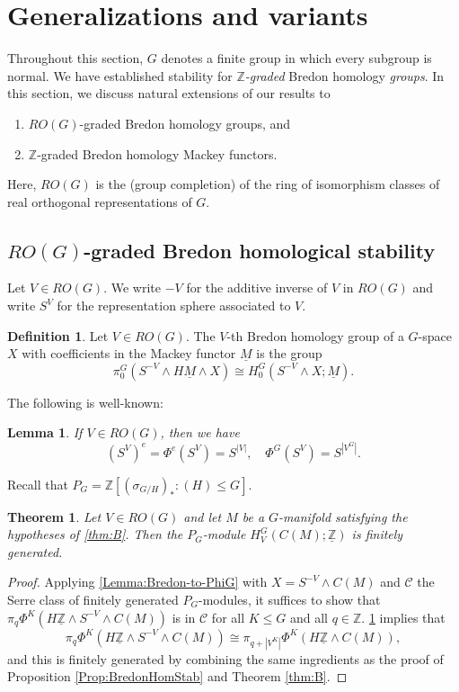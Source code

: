 \documentclass[11pt]{amsart}
\newtheorem{lemma}[equation]{Lemma}
\newtheorem{theorem}[equation]{Theorem}
\theoremstyle{definition}
\newtheorem{definition}[equation]{Definition}
\numberwithin{equation}{subsection} %
\def\z{\mathbb{Z}}
\def\cc{\mathcal{C}}
\def\uM{\underline{M}}
\def\uM{\underline{M}}
\def\mfz{\underline{\mathbb{Z}}}
\newcommand{\Z}{\mathbb{Z}}
\begin{document}
\section{Generalizations and variants}\label{Sec:Gen}

Throughout this section, $G$ denotes a finite group in which every subgroup is normal. We have established stability for \emph{$\z$-graded} Bredon homology \emph{groups}. In this section, we discuss natural extensions of our results to
\begin{enumerate}
\item $RO(G)$-graded Bredon homology groups, and
\item $\z$-graded Bredon homology Mackey functors.
\end{enumerate}
Here, $RO(G)$ is the (group completion) of the ring of isomorphism classes of real orthogonal representations of $G$. 

\subsection{$RO(G)$-graded Bredon homological stability}

Let $V \in RO(G)$. We write $-V$ for the additive inverse of $V$ in $RO(G)$ and write $S^V$ for the representation sphere associated to $V$. 

\begin{definition}
Let $V \in RO(G)$. The $V$-th Bredon homology group of a $G$-space $X$ with coefficients in the Mackey functor $\uM$ is the group
$$\pi_0^G\left( S^{-V} \wedge H\uM \wedge X \right) \cong H_0^G( S^{-V} \wedge X; \uM).$$
\end{definition}

The following is well-known:

\begin{lemma}\label{Lem:RepSpheres}
If $V \in RO(G)$, then we have 
$$(S^V)^e = \Phi^e(S^V) = S^{|V|}, \quad  \Phi^G(S^V) = S^{|V^G|}.$$
\end{lemma}

Recall that $P_G = \Z[(\sigma_{G/H})_* : (H)\leq G]$.
\begin{theorem}\label{Thm:ROG}
Let $V \in RO(G)$ and let $M$ be a $G$-manifold satisfying the hypotheses of
\cref{thm:B}. Then the $P_G$-module $H_V^G(C(M);\mfz)$ is finitely generated. 
\end{theorem}

\begin{proof}
Applying \cref{Lemma:Bredon-to-PhiG} with $X = S^{-V} \wedge C(M)$ and $\cc$ the Serre class of finitely generated $P_G$-modules, it suffices to show that $\pi_q \Phi^K(H\mfz \wedge S^{-V} \wedge C(M))$ is in $\cc$ for all $K \leq G$ and all $q \in \z$. \cref{Lem:RepSpheres} implies that
$$\pi_q \Phi^K \left(H\mfz \wedge S^{-V} \wedge C(M) \right) \cong \pi_{q+|V^K|} \Phi^K \left(H\mfz \wedge C(M) \right),$$
and this is finitely generated by combining the same ingredients as the proof of
Proposition \ref{Prop:BredonHomStab} and Theorem \ref{thm:B}.
\end{proof}
\end{document}
